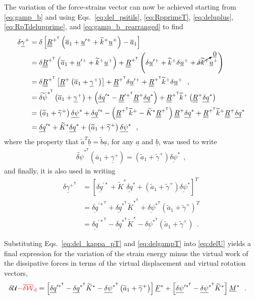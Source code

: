 \documentclass[12pt,a4paper,oneside,english]{abntex2} %
\newcommand{\fix}[1]{{\color{red}#1}}
\newcommand{\vect}[1]{\underline{#1}}
\newcommand{\uvec}[1]{\overline{#1}}
\def\tens#1{\underline{\underline{#1}}}
\def\til#1{\widetilde{#1}}
\def\lb{\left[}
\def\rb{\right]}
\def\lp{\left(}
\def\rp{\right)}
\def\T{\mathsf{T}}
\def\aone{\uvec{a}_1}
\def\aonetil{\til{a}_1}
\def\R{\tens{R}}
\def\Rp{\R^+}
\def\RpT{\R^{+^\T}}
\def\RpprimeT{\R^{{\prime +}^\T}}
\def\u{\vect{u}}
\def\uplus{\u^{+}}
\def\upprime{\u^{\prime+}}
\def\gam{\vect{\gamma}}
\def\gamp{\gam^{+}}
\def\gampT{\gam^{+^\T}}
\def\gamptil{\til{\gamma}^{+}}
\def\ktil{\til{k}}
\def\ktilp{\ktil^{+}}
\def\Ktil{\til{K}}
\def\Ktils{\Ktil^{*}}
\def\KtilsT{\Ktil^{*^\T}}
\def\F{\vect{F}}
\def\Fs{\F^*}
\def\M{\vect{M}}
\def\Ms{\M^*}
\def\delq{\vect{\delta q}}
\def\delqs{\delq^*}
\def\delqsT{\delq^{*^\T}}
\def\delqps{\delq^{\prime*}}
\def\delqpsT{\delq^{{\prime*}^\T}}
\def\delpsi{\vect{\delta\psi}}
\def\delpsis{\delpsi^*}
\def\delpsisT{\delpsi^{*^\T}}
\def\delpsipsT{\delpsi^{\prime*^\T}}
\def\delpsitil{\til{\delta\psi}}
\def\delpsitilsT{\delpsitil^{*^\T}}
\def\zv{\vect{0}}
\def\deltaWd{\overline{\delta\mathcal{W}}_{\text{d}}}
\begin{document}
\begin{apendicesenv}
The variation of the force-strains vector can now be achieved starting from \cref{eq:gamp_b} and using Eqs.~\eqref{eq:del_psitils}, \eqref{eq:RpprimeT}, \eqref{eq:deluplus}, \eqref{eq:RpTdelupprime}, and \eqref{eq:gamp_b_rearranged} to find
\begin{align}
    \delta\gamp &= \delta\lb\RpT\lp\aone + \upprime + \ktilp\uplus\rp - \aone\rb \nonumber 
    \\
    &= \delta\RpT\lp\aone+\upprime+\ktilp\uplus\rp + \RpT\lp\delta\upprime + \ktilp\delta\uplus+ \cancelto{\zv}{\delta\ktilp}\uplus\rp \nonumber 
    \\
    &= \delta\RpT\lb\Rp\lp\aone+\gamp\rp\rb + \RpT\delta\upprime + \RpT\ktilp\delta\uplus \ \ , \label{eq:delgamp_analogy} 
    \\
    &= \delpsitilsT\lp\aone+\gamp\rp + \lp\delqps - \RpprimeT\Rp\delqs\rp + \RpT\ktilp\lp\Rp\delqs\rp \nonumber 
    \\
    &= \lp\aonetil+\gamptil\rp\delpsis + \delqps - \lp\RpT\ktilp - \Ktils\RpT\rp\Rp\delqs + \RpT\ktilp\Rp\delqs \nonumber 
    \\
    &= \delqps + \Ktils\delqs + \lp\aonetil+\gamptil\rp\delpsis  \ \ ,
    \label{eq:delgamp}
\end{align}
where the property that $\til{a}^T\vect{b} = \til{b}\vect{a}$, for any $\vect{a}$ and $\vect{b}$, was used to write 
\begin{align}
\delpsitilsT\lp\aone+\gamp\rp = \lp\aonetil+\gamptil\rp\delpsis \ \ , 
\end{align}
and finally, it is also used in writing
\begin{align}
    \delta\gampT &= \lb\delqps + \Ktils\delqs + \lp\aonetil+\gamptil\rp\delpsis\rb^T \nonumber 
    \\
    &= \delqpsT + \delqsT\KtilsT + \delpsisT\lp\aonetil+\gamptil\rp^T \nonumber 
    \\
    &= \delqpsT - \delqsT\Ktils - \delpsisT\lp\aonetil+\gamptil\rp \ \ .
    \label{eq:delgampT}
\end{align}

Substituting Eqs.~\eqref{eq:del_kappa_pT} and \eqref{eq:delgampT} into \cref{eq:delU} yields a final expression for the variation of the strain energy \fix{minus the virtual work of the dissipative forces} in terms of the virtual displacement and virtual rotation vectors,
\begin{align}
    \delta\mathcal{U} \fix{- \deltaWd} &= \lb\delqpsT - \delqsT\Ktils - \delpsisT\lp\aonetil+\gamptil\rp\rb\Fs + \lb\delpsipsT - \delpsisT\Ktils\rb\Ms \ \ .
    \label{eq:delU_final}
\end{align}


\end{apendicesenv}
\end{document}
